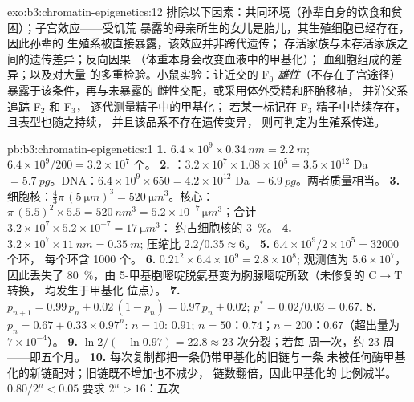 \begin{solution}{exo:b3:chromatin-epigenetics:12}
排除以下因素：共同环境（孙辈自身的饮食和贫困）；子宫效应——受饥荒
暴露的母亲所生的女儿是胎儿，其生殖细胞已经存在，因此孙辈的
生殖系被直接暴露，该效应并非跨代遗传；
存活家族与未存活家族之间的遗传差异；反向因果
（体重本身会改变血液中的甲基化）；
血细胞组成的差异；以及对大量  的多重检验。小鼠实验：让近交的
F$_0$ \emph{雄性}（不存在子宫途径）暴露于该条件，再与未暴露的
雌性交配，或采用体外受精和胚胎移植，
并沿父系追踪 F$_2$ 和 F$_3$，
逐代测量精子中的甲基化；
若某一标记在 F$_3$ 精子中持续存在，且表型也随之持续，
并且该品系不存在遗传变异，
则可判定为生殖系传递。
\end{solution}

\begin{solution}{pb:b3:chromatin-epigenetics:1}
\textbf{1.} $6.4\times 10^{9}\times \qty{0.34}{nm} = \qty{2.2}{m}$;
$6.4\times 10^{9}/200 = 3.2\times 10^{7}$ 个。
\textbf{2.} ：$3.2\times 10^{7}\times 1.08\times 10^{5} =
3.5\times 10^{12}$ Da $= \qty{5.7}{pg}$。DNA：$6.4\times 10^{9}\times
650 = 4.2\times 10^{12}$ Da $= \qty{6.9}{pg}$。两者质量相当。
\textbf{3.} 细胞核：$\tfrac{4}{3}\pi\,(\qty{5}{\micro m})^{3} =
\qty{520}{\micro m^3}$。核心：$\pi\,(5.5)^{2}\times 5.5 =
\qty{520}{nm^3} = 5.2\times 10^{-7}\,\unit{\micro m^3}$；合计
$3.2\times 10^{7}\times 5.2\times 10^{-7} = \qty{17}{\micro m^3}$：
约占细胞核的 \qty{3}{\%}。
\textbf{4.} $3.2\times 10^{7}\times \qty{11}{nm} = \qty{0.35}{m}$;
压缩比 $2.2/0.35 \approx 6$。
\textbf{5.} $6.4\times 10^{9}/2\times 10^{5} = \num{32000}$ 个环，
每个环含 \num{1000} 个。
\textbf{6.} $0.21^{2}\times 6.4\times 10^{9} = 2.8\times 10^{8}$;
观测值为 $5.6\times 10^{7}$，因此丢失了 \qty{80}{\%}，由
5-甲基胞嘧啶脱氨基变为胸腺嘧啶所致（未修复的 C$\to$T 转换，
均发生于甲基化  位点）。
\textbf{7.} $p_{n+1} = 0.99\,p_{n} + 0.02\,(1 - p_{n}) = 0.97\,p_{n} +
0.02$; $p^{*} = 0.02/0.03 = 0.67$.
\textbf{8.} $p_{n} = 0.67 + 0.33\times 0.97^{n}$: $n = 10$: $0.91$;
$n = 50$：$0.74$；$n = 200$：$0.67$（超出量为 $7\times 10^{-4}$）。
\textbf{9.} $\ln 2/(-\ln 0.97) = 22.8 \approx 23$ 次分裂；若每
周一次，约 \num{23} 周——即五个月。
\textbf{10.} 每次复制都把一条仍带甲基化的旧链与一条
未被任何酶甲基化的新链配对；旧链既不增加也不减少，
链数翻倍，因此甲基化的
比例减半。$0.80/2^{n} < 0.05$ 要求 $2^{n} > 16$：五次

\end{solution}

